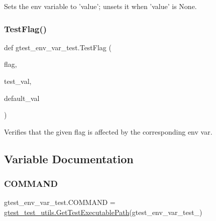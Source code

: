 \begin{DoxyVerb}Sets the env variable to 'value'; unsets it when 'value' is None.\end{DoxyVerb}
 \mbox{\label{namespacegtest__env__var__test_aa7bb6bbb50ba35349bbdae6d881faee8}} 
\subsubsection{\texorpdfstring{Test\+Flag()}{TestFlag()}}
{\footnotesize\ttfamily def gtest\+\_\+env\+\_\+var\+\_\+test.\+Test\+Flag (\begin{DoxyParamCaption}\item[{}]{flag,  }\item[{}]{test\+\_\+val,  }\item[{}]{default\+\_\+val }\end{DoxyParamCaption})}

\begin{DoxyVerb}Verifies that the given flag is affected by the corresponding env var.\end{DoxyVerb}
 

\subsection{Variable Documentation}
\mbox{\label{namespacegtest__env__var__test_a36e02e39934750d022966df31c568a53}} 
\subsubsection{\texorpdfstring{C\+O\+M\+M\+A\+ND}{COMMAND}}
{\footnotesize\ttfamily gtest\+\_\+env\+\_\+var\+\_\+test.\+C\+O\+M\+M\+A\+ND = \hyperlink{namespacegtest__test__utils_a89ed3717984a80ffbb7a9c92f71b86a2}{gtest\+\_\+test\+\_\+utils.\+Get\+Test\+Executable\+Path}(\textquotesingle{}gtest\+\_\+env\+\_\+var\+\_\+test\+\_\+\textquotesingle{})}

\mbox{\label{namespacegtest__env__var__test_ac671a59c1b805f7e9511e91380865cda}} 
